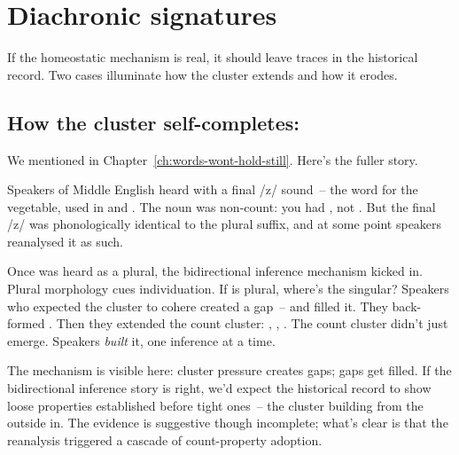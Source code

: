 \section{Diachronic signatures}
\label{sec:9:diachronic}

If the homeostatic mechanism is real, it should leave traces in the historical record. Two cases illuminate how the cluster extends and how it erodes.

\subsection{How the cluster self-completes: }
\label{sec:9:pea}

We mentioned  in Chapter~\ref{ch:words-wont-hold-still}. Here's the fuller story.

Speakers of Middle English heard  with a final /z/ sound~-- the word for the vegetable, used in  and . The noun was non-count: you had , not . But the final /z/ was phonologically identical to the plural suffix, and at some point speakers reanalysed it as such.

Once  was heard as a plural, the bidirectional inference mechanism kicked in. Plural morphology cues individuation. If  is plural, where's the singular? Speakers who expected the cluster to cohere created a gap~-- and filled it. They back-formed . Then they extended the count cluster: , , . The count cluster didn't just emerge. Speakers \emph{built} it, one inference at a time.

The mechanism is visible here: cluster pressure creates gaps; gaps get filled. If the bidirectional inference story is right, we'd expect the historical record to show loose properties established before tight ones~-- the cluster building from the outside in. The evidence is suggestive though incomplete; what's clear is that the reanalysis triggered a cascade of count-property adoption.

